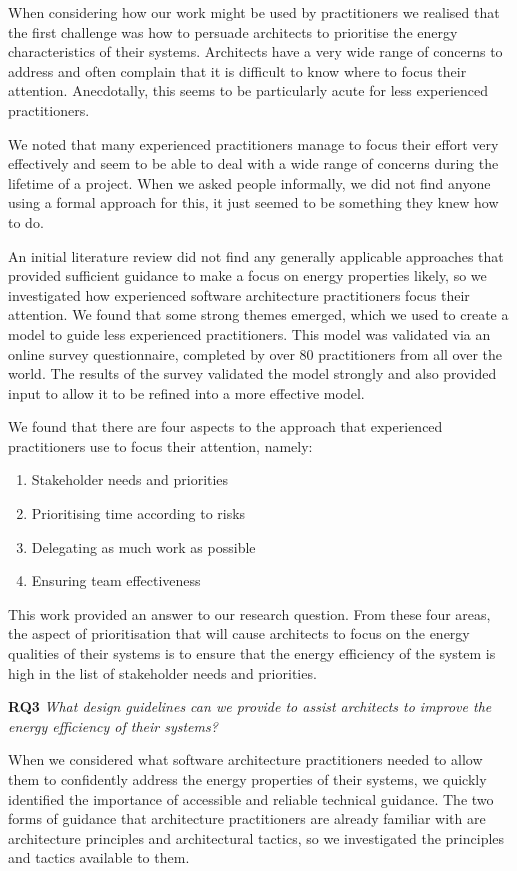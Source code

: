 When considering how our work might be used by practitioners we realised that the first challenge was how to persuade architects to prioritise the energy characteristics of their systems.  Architects have a very wide range of concerns to address and often complain that it is difficult to know where to focus their attention.  Anecdotally, this seems to be particularly acute for less experienced practitioners.

We noted that many experienced practitioners manage to focus their effort very effectively and seem to be able to deal with a wide range of concerns during the lifetime of a project.  When we asked people informally, we did not find anyone using a formal approach for this, it just seemed to be something they knew how to do.

An initial literature review did not find any generally applicable approaches that provided sufficient guidance to make a focus on energy properties likely, so we investigated how experienced software architecture practitioners focus their attention.  We found that some strong themes emerged, which we used to create a model to guide less experienced practitioners.  This model was validated via an online survey questionnaire, completed by over 80 practitioners from all over the world.  The results of the survey validated the model strongly and also provided input to allow it to be refined into a more effective model.

We found that there are four aspects to the approach that experienced practitioners use to focus their attention, namely:
\begin{enumerate}
	\item Stakeholder needs and priorities
	\item Prioritising time according to risks
	\item Delegating as much work as possible
	\item Ensuring team effectiveness
\end{enumerate}

This work provided an answer to our research question.  From these four areas, the aspect of prioritisation that will cause architects to focus on the energy qualities of their systems is to ensure that the energy efficiency of the system is high in the list of stakeholder needs and priorities.

\textbf{RQ3} \emph{What design guidelines can we provide to assist architects to improve the energy efficiency of their systems?}

When we considered what software architecture practitioners needed to allow them to confidently address the energy properties of their systems, we quickly identified the importance of accessible and reliable technical guidance.  The two forms of guidance that architecture practitioners are already familiar with are architecture principles and architectural tactics, so we investigated the principles and tactics available to them.

